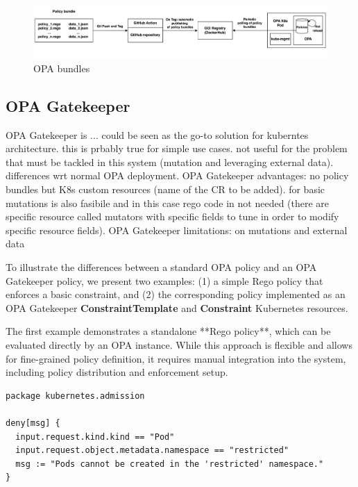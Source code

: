 \begin{figure}[htb]
\centering
\includegraphics[width=1\linewidth]{images/opa_bundles.png}
\caption{OPA bundles}
\label{fig:opa_bundles}
\end{figure}


\subsection{OPA Gatekeeper}

OPA Gatekeeper is ... could be seen as the go-to solution for kuberntes architecture.
this is prbably true for simple use cases. not useful for the problem that must be tackled in this system (mutation and leveraging external data). differences wrt normal OPA deployment. OPA Gatekeeper advantages: no policy bundles but K8s custom resources (name of the CR to be added). for basic mutations is also fasibile and in this case rego code in not needed (there are specific resource called mutators with specific fields to tune in order to modify specific resource fields). OPA Gatekeeper limitations: on mutations and external data





To illustrate the differences between a standard OPA policy and an OPA Gatekeeper policy, we present two examples:  
(1) a simple Rego policy that enforces a basic constraint, and  
(2) the corresponding policy implemented as an OPA Gatekeeper \textbf{ConstraintTemplate} and \textbf{Constraint} Kubernetes resources.

The first example demonstrates a standalone **Rego policy**, which can be evaluated directly by an OPA instance. While this approach is flexible and allows for fine-grained policy definition, it requires manual integration into the system, including policy distribution and enforcement setup.  

\begin{lstlisting}[language=rego, caption={Simple OPA Rego Policy}, label={lst:opa-rego}]
package kubernetes.admission

deny[msg] {
  input.request.kind.kind == "Pod"
  input.request.object.metadata.namespace == "restricted"
  msg := "Pods cannot be created in the 'restricted' namespace."
}
\end{lstlisting}

